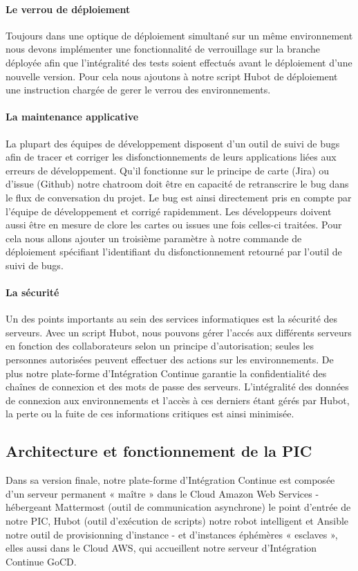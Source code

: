           \paragraph{Le verrou de déploiement} Toujours dans une optique de déploiement simultané sur un même environnement nous devons implémenter une fonctionnalité de verrouillage sur la branche déployée afin que l'intégralité des tests soient effectués avant le déploiement d'une nouvelle version. Pour cela nous ajoutons à notre script Hubot de déploiement une instruction chargée de gerer le verrou des environnements.

          \paragraph{La maintenance applicative} La plupart des équipes de développement disposent d'un outil de suivi de bugs afin de tracer et corriger les disfonctionnements de leurs applications liées aux erreurs de développement. Qu'il fonctionne sur le principe de carte (Jira) ou d'issue (Github) notre chatroom doit être en capacité de retranscrire le bug dans le flux de conversation du projet. Le bug est ainsi directement pris en compte par l'équipe de développement et corrigé rapidemment. Les développeurs doivent aussi être en mesure de clore les cartes ou issues une fois celles-ci traitées. Pour cela nous allons ajouter un troisième paramètre à notre commande de déploiement spécifiant l'identifiant du disfonctionnement retourné par l'outil de suivi de bugs.

          \paragraph{La sécurité} Un des points importants au sein des services informatiques est la sécurité des serveurs. Avec un script Hubot, nous pouvons gérer l'accés aux différents serveurs en fonction des collaborateurs selon un principe d'autorisation; seules les personnes autorisées peuvent effectuer des actions sur les environnements. De plus notre plate-forme d'Intégration Continue garantie la confidentialité des chaînes de connexion et des mots de passe des serveurs. L'intégralité des données de connexion aux environnements et l'accès à ces derniers étant gérés par Hubot, la perte ou la fuite de ces informations critiques est ainsi minimisée.

      \subsection{Architecture et fonctionnement de la PIC}
      Dans sa version finale, notre plate-forme d'Intégration Continue est composée d'un serveur permanent « maître » dans le Cloud Amazon Web Services - hébergeant Mattermost (outil de communication asynchrone) le point d'entrée de notre PIC, Hubot (outil d'exécution de scripts) notre robot intelligent et Ansible notre outil de provisionning d'instance - et d'instances éphémères « esclaves », elles aussi dans le Cloud AWS, qui accueillent notre serveur d'Intégration Continue GoCD.\\

